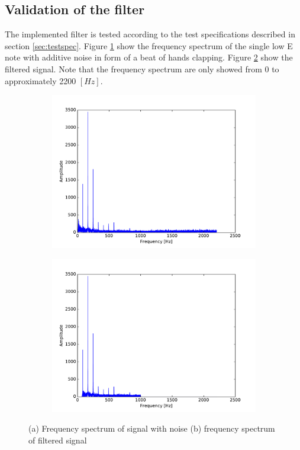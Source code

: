 \subsection{Validation of the filter}
The implemented filter is tested according to the test specifications described in section \ref{sec:testspec}. Figure \ref{fig:SIGNAL} show the frequency spectrum of the single low E note with additive noise in form of a beat of hands clapping. Figure \ref{fig:filt_SIGNAL} show the filtered signal. Note that the frequency spectrum are only showed from 0 to approximately 2200 $[Hz]$.  

\begin{figure}[H]
\centering
\begin{subfigure}{0.49\textwidth}
\centering
\includegraphics[width=\textwidth]{figures/filtertest/SIGNAL.pdf}
\caption{}
\label{fig:SIGNAL}
\end{subfigure}
\begin{subfigure}{0.49\textwidth}
\centering
\includegraphics[width=\textwidth]{figures/filtertest/filt_SIGNAL.pdf}
\caption{}
\label{fig:filt_SIGNAL}
\end{subfigure}
\caption{(a) Frequency spectrum of signal with noise (b) frequency spectrum of filtered signal}
\label{fig:test_res}
\end{figure}
